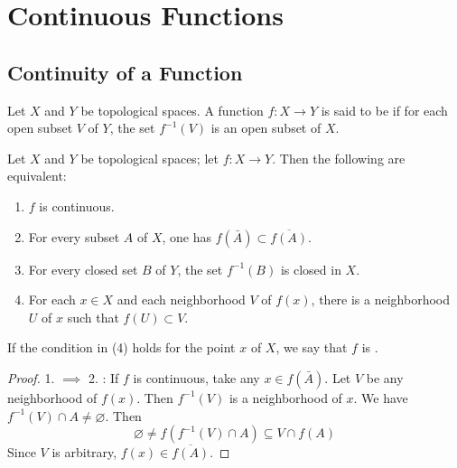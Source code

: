 \documentclass[../main.tex]{subfiles}
\begin{document}
\ifSubfilesClassLoaded{

    \tableofcontents
    
}{}

\chapter{ Continuous Functions }

\section{Continuity of a Function}


\begin{definition}{}{}
Let $X$ and $Y$ be topological spaces. A function $f: X \to Y$ is said to be  if for each open subset $V$ of $Y$, the set $f^{-1}(V)$ is an open subset of $X$.
\end{definition}

\begin{theorem}{}{}
Let $X$ and $Y$ be topological spaces; let $f : X \to Y$. Then the following are equivalent:
\begin{enumerate}
    \item $f$ is continuous.
    \item For every subset $A$ of $X$, one has $f(\bar{A}) \subset \overline{f(A)}$.
    \item For every closed set $B$ of $Y$, the set $f^{-1}(B)$ is closed in $X$.
    \item For each $x \in X$ and each neighborhood $V$ of $f(x)$, there is a neighborhood $U$ of $x$ such that $f(U) \subset V$.
\end{enumerate}
\end{theorem}
\begin{remark}
    
If the condition in (4) holds for the point $x$ of $X$, we say that $f$ is .

\end{remark}

\begin{proof}
    1. \(  \implies   \) 2. : If \(  f  \) is continuous, take any  \(  x \in f\left( \bar{A} \right)   \). Let \(  V  \) be any neighborhood of \(  f\left( x \right)   \). Then \(  f^{-1} \left( V \right)   \) is a neighborhood of \(  x  \). We have \(  f^{-1} \left( V \right)\cap A\neq \varnothing   \). Then \[
    \varnothing\neq  f\left( f^{-1} \left( V \right)\cap A  \right)\subseteq V\cap f\left( A \right)  
    \]        Since \(  V  \) is arbitrary, \(  f\left( x \right) \in  \overline{f\left( A \right) }   \).  
\end{proof}
\end{document}
